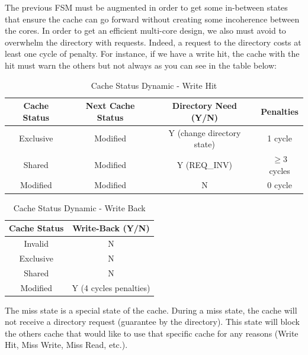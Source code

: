 \documentclass[10pt,letterpaper]{article}
\begin{document}
\noindent The previous FSM must be augmented in order to get some in-between states that ensure the cache can go forward without creating some incoherence between the cores. In order to get an efficient multi-core design, we also must avoid to overwhelm the directory with requests. Indeed, a request to the directory costs at least one cycle of penalty. For instance, if we have a write hit, the cache with the hit must warn the others but not always as you can see in the table below:\\

\begin{table}[H]
\begin{center}
\begin{tabular}{||c c c c ||} 
 \hline
 Cache Status & Next Cache Status & Directory Need (Y/N) & Penalties \\ [0.5ex] 
 \hline\hline
 Exclusive & Modified & Y (change directory state) & 1 cycle \\
 \hline
 Shared & Modified & Y (REQ\_INV) & $\geq 3$ cycles \\
 \hline
 Modified & Modified & N & 0 cycle\\
 \hline
\end{tabular}
\caption{Cache Status Dynamic - Write Hit}
\label{fig:cacheStatusDyn_hitwrite}
\end{center}
\end{table}

\begin{table}[H]
\begin{center}
\begin{tabular}{||c c ||} 
 \hline
 Cache Status & Write-Back (Y/N) \\ [0.5ex] 
 \hline\hline
 Invalid & N\\
 \hline
 Exclusive & N\\
 \hline
 Shared & N\\
 \hline
 Modified & Y (4 cycles penalties)\\
 \hline
\end{tabular}
\caption{Cache Status Dynamic - Write Back}
\label{fig:cacheStatusDyn_writeback}
\end{center}
\end{table}

The miss state is a special state of the cache. During a miss state, the cache will not receive a directory request (guarantee by the directory). This state will block the others cache that would like to use that specific cache for any reasons (Write Hit, Miss Write, Miss Read, etc.). 
\end{document}
